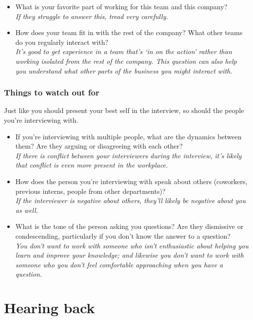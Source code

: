 \begin{itemize}
\item What is your favorite part of working for this team and this company? \\{\it If they struggle to answer this, tread very carefully.}
\item How does your team fit in with the rest of the company? What other teams do you regularly interact with? \\{\it It's good to get experience in a team that's `in on the action' rather than working isolated from the rest of the company. This question can also help you understand what other parts of the business you might interact with.}
\end{itemize}

\subsubsection{Things to watch out for}
Just like you should present your best self in the interview, so should the people you're interviewing with. 

\begin{itemize}
\item If you're interviewing with multiple people, what are the dynamics between them? Are they arguing or disagreeing with each other? \\{\it If there is conflict between your interviewers during the interview, it's likely that conflict is even more present in the workplace. }
\item How does the person you're interviewing with speak about others (coworkers, previous interns, people from other departments)? \\{\it If the interviewer is negative about others, they'll likely be negative about you as well. }
\item What is the tone of the person asking you questions? Are they dismissive or condescending, particularly if you don't know the answer to a question? \\{\it You don't want to work with someone who isn't enthusiastic about helping you learn and improve your knowledge; and likewise you don't want to work with someone who you don't feel comfortable approaching when you have a question.}
\end{itemize}

\section{Hearing back}

